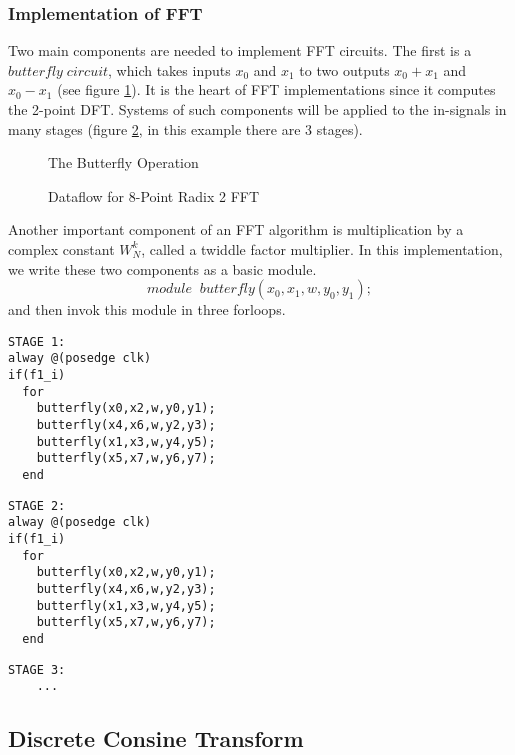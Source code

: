 \subsubsection{Implementation of FFT}
%
Two main components are needed to implement FFT circuits. The first is a $butterfly \; circuit$, which takes inputs $x_0$ and $x_1$ to two outputs $x_0 + x_1$ and $x_0 - x_1$ (see figure \ref{fig-butterfly}). It is the heart of FFT implementations since it computes the 2-point DFT. Systems of such components will be applied to the in-signals in many stages (figure \ref{fig-2radixfft}, in this example there are 3 stages).\\
\begin{figure}[h]
\centering
{}
\caption{The Butterfly Operation}
\label{fig-butterfly}
\end{figure}
\begin{figure}[h]
\centering
{}
\caption{Dataflow for 8-Point Radix 2 FFT}
\label{fig-2radixfft}
\end{figure}
Another important component of an FFT algorithm is multiplication by a complex constant $W_N^k$, called a twiddle factor multiplier. In this implementation, we write these two components as a basic module.
\[ module\;\; butterfly(x_0, x_1, w, y_0, y_1);\]
and then invok this module in three forloops.
\begin{verbatim}
STAGE 1:
alway @(posedge clk)
if(f1_i)
  for
    butterfly(x0,x2,w,y0,y1);
    butterfly(x4,x6,w,y2,y3);
    butterfly(x1,x3,w,y4,y5);
    butterfly(x5,x7,w,y6,y7);
  end
\end{verbatim}
\begin{verbatim}
STAGE 2:
alway @(posedge clk)
if(f1_i)
  for
    butterfly(x0,x2,w,y0,y1);
    butterfly(x4,x6,w,y2,y3);
    butterfly(x1,x3,w,y4,y5);
    butterfly(x5,x7,w,y6,y7);
  end
\end{verbatim}
\begin{verbatim}
STAGE 3:
    ...
\end{verbatim}

\subsection{Discrete Consine Transform}
